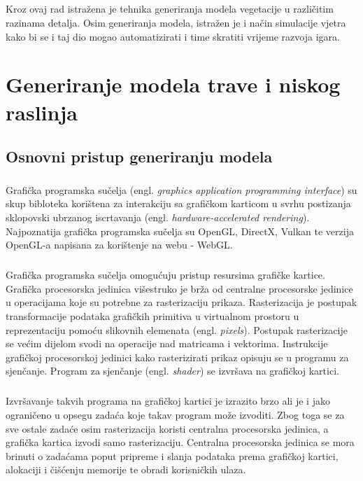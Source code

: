 \documentclass[times, utf8, diplomski]{fer}
\begin{document}
\paragraph{}
Kroz ovaj rad istražena je tehnika generiranja modela vegetacije u različitim razinama 
detalja. Osim generiranja modela, istražen je i način simulacije vjetra kako bi se i taj dio 
mogao automatizirati i time skratiti vrijeme razvoja igara.


\chapter{Generiranje modela trave i niskog raslinja}
\section{Osnovni pristup generiranju modela} \label{generation_basics}
\paragraph{}
Grafička programska sučelja (engl. \textit{graphics application programming interface}) su 
skup bibloteka korištena za interakciju sa grafičkom karticom u svrhu postizanja
sklopovski ubrzanog iscrtavanja (engl. \textit{hardware-accelerated rendering}). Najpoznatija grafička programska sučelja su OpenGL, DirectX, Vulkan te verzija OpenGL-a 
napisana za korištenje na webu - WebGL.

\paragraph{}
Grafička programska sučelja omogućuju pristup resursima grafičke kartice. Grafička 
procesorska jedinica višestruko je brža od centralne procesorske jedinice u operacijama 
koje su potrebne za rasterizaciju prikaza. Rasterizacija je postupak transformacije 
podataka grafičkih primitiva u virtualnom prostoru u reprezentaciju pomoću slikovnih 
elemenata (engl. \textit{pixels}). Postupak rasterizacije se većim dijelom svodi na 
operacije nad matricama i vektorima. Instrukcije grafičkoj procesorskoj jedinici kako 
rasterizirati prikaz opisuju se u programu za sjenčanje. Program za sjenčanje (engl. 
\textit{shader}) se izvršava na grafičkoj kartici.

\paragraph{}
Izvršavanje takvih programa na grafičkoj kartici je izrazito brzo ali je i jako ograničeno 
u opsegu zadaća koje takav program može izvoditi. Zbog toga se za sve ostale zadaće osim 
rasterizacija koristi centralna procesorska jedinica, a grafička kartica izvodi samo 
rasterizaciju. Centralna procesorska jedinica se mora brinuti o zadaćama poput pripreme i 
slanja podataka prema grafičkoj kartici, alokaciji i čišćenju memorije te obradi 
korisničkih ulaza.
\end{document}
